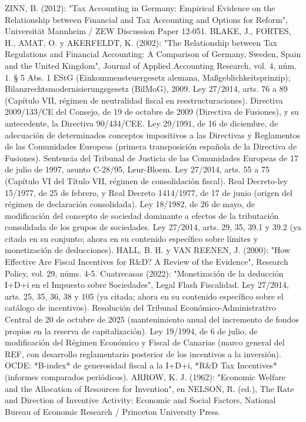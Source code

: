 \documentclass[10pt,a4paper]{article}
\begin{document}
ZINN, B. (2012): "Tax Accounting in Germany: Empirical Evidence on the Relationship between Financial and Tax Accounting and Options for Reform", Universität Mannheim / ZEW Discussion Paper 12-051.
BLAKE, J., FORTES, H., AMAT, O. y AKERFELDT, K. (2002): "The Relationship between Tax Regulations and Financial Accounting: A Comparison of Germany, Sweden, Spain and the United Kingdom", Journal of Applied Accounting Research, vol. 4, núm. 1.
§ 5 Abs. 1 EStG (Einkommensteuergesetz alemana, Maßgeblichkeitsprinzip); Bilanzrechtsmodernisierungsgesetz (BilMoG), 2009.
Ley 27/2014, arts. 76 a 89 (Capítulo VII, régimen de neutralidad fiscal en reestructuraciones).
Directiva 2009/133/CE del Consejo, de 19 de octubre de 2009 (Directiva de Fusiones), y su antecedente, la Directiva 90/434/CEE.
Ley 29/1991, de 16 de diciembre, de adecuación de determinados conceptos impositivos a las Directivas y Reglamentos de las Comunidades Europeas (primera transposición española de la Directiva de Fusiones).
Sentencia del Tribunal de Justicia de las Comunidades Europeas de 17 de julio de 1997, asunto C-28/95, Leur-Bloem.
Ley 27/2014, arts. 55 a 75 (Capítulo VI del Título VII, régimen de consolidación fiscal).
Real Decreto-ley 15/1977, de 25 de febrero, y Real Decreto 1414/1977, de 17 de junio (origen del régimen de declaración consolidada).
Ley 18/1982, de 26 de mayo, de modificación del concepto de sociedad dominante a efectos de la tributación consolidada de los grupos de sociedades.
Ley 27/2014, arts. 29, 35, 39.1 y 39.2 (ya citada en su conjunto; ahora en su contenido específico sobre límites y monetización de deducciones).
HALL, B. H. y VAN REENEN, J. (2000): "How Effective Are Fiscal Incentives for R&D? A Review of the Evidence", Research Policy, vol. 29, núms. 4-5.
Cuatrecasas (2022): "Monetización de la deducción I+D+i en el Impuesto sobre Sociedades", Legal Flash Fiscalidad.
Ley 27/2014, arts. 25, 35, 36, 38 y 105 (ya citada; ahora en su contenido específico sobre el catálogo de incentivos).
Resolución del Tribunal Económico-Administrativo Central de 20 de octubre de 2025 (mantenimiento anual del incremento de fondos propios en la reserva de capitalización).
Ley 19/1994, de 6 de julio, de modificación del Régimen Económico y Fiscal de Canarias (marco general del REF, con desarrollo reglamentario posterior de los incentivos a la inversión).
OCDE: *B-index* de generosidad fiscal a la I+D+i, *R&D Tax Incentives* (informes comparados periódicos).
ARROW, K. J. (1962): "Economic Welfare and the Allocation of Resources for Invention", en NELSON, R. (ed.), The Rate and Direction of Inventive Activity: Economic and Social Factors, National Bureau of Economic Research / Princeton University Press.
\end{document}
